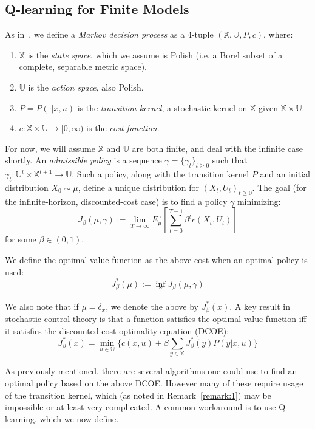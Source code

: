 \documentclass{article}
\begin{document}
\subsection{Q-learning for Finite Models}
As in~\cite[Chapter 2]{Lerma}, we define a \emph{Markov decision process} as a 4-tuple \((\mathbb{X},\mathbb{U},P,c)\), where:
\begin{enumerate}
    \item \(\mathbb{X}\) is the \emph{state space}, which we assume is Polish (i.e. a Borel subset of a complete, separable metric space).
    \item \(\mathbb{U}\) is the \emph{action space}, also Polish.
    \item \(P = P(\cdot|x,u)\) is the \emph{transition kernel}, a stochastic kernel on \(\mathbb{X}\) given \(\mathbb{X} \times \mathbb{U}\).
    \item \(c : \mathbb{X} \times \mathbb{U} \to [0,\infty)\) is the \emph{cost function}.
\end{enumerate}

For now, we will assume \(\mathbb{X}\) and \(\mathbb{U}\) are both finite, and deal with the infinite case shortly.
\newpage
An \emph{admissible policy} is a sequence \(\gamma = \{\gamma_t\}_{t\ge0}\) such that \(\gamma_t : \mathbb{U}^t \times \mathbb{X}^{t+1} \to \mathbb{U}\). Such a policy, along with the transition kernel \(P\) and an initial distribution \(X_0 \sim \mu\), define a unique distribution for \((X_t,U_t)_{t\ge0}\). The goal (for the infinite-horizon, discounted-cost case) is to find a policy \(\gamma\) minimizing:
\[J_\beta(\mu,\gamma) := \lim_{T\to\infty}E^\gamma_\mu\left[\sum_{t=0}^{T-1}\beta^t c(X_t,U_t) \right]\]
for some \(\beta \in (0,1)\).

We define the optimal value function as the above cost when an optimal policy is used:
\[J_\beta^*(\mu) := \inf_{\gamma}J_\beta(\mu,\gamma)\]

We also note that if \(\mu = \delta_x\), we denote the above by \(J_\beta^*(x)\). A key result in stochastic control theory is that a function satisfies the optimal value function iff it satisfies the discounted cost optimality equation (DCOE):
\begin{equation} J_\beta^*(x) = \min_{u\in\mathbb{U}}\biggl\{ c(x,u) + \beta\sum_{y \in \mathbb{X}}J^*_\beta(y)P(y | x,u) \biggl\}\label{eq:DCOE} \end{equation}

As previously mentioned, there are several algorithms one could use to find an optimal policy based on the above DCOE. However many of these require usage of the transition kernel, which (as noted in Remark~\ref{remark:1}) may be impossible or at least very complicated. A common workaround is to use Q-learning, which we now define.
\end{document}
